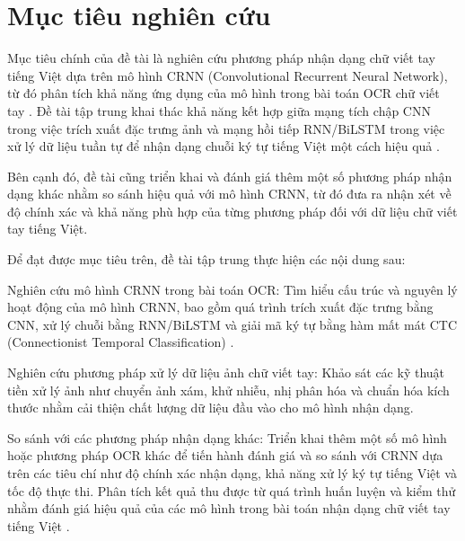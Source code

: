 
\section{Mục tiêu nghiên cứu}

Mục tiêu chính của đề tài là nghiên cứu phương pháp nhận dạng chữ viết tay tiếng Việt dựa trên mô hình CRNN (Convolutional Recurrent Neural Network), từ đó phân tích khả năng ứng dụng của mô hình trong bài toán OCR chữ viết tay \cite{Reference5}. Đề tài tập trung khai thác khả năng kết hợp giữa mạng tích chập CNN trong việc trích xuất đặc trưng ảnh và mạng hồi tiếp RNN/BiLSTM trong việc xử lý dữ liệu tuần tự để nhận dạng chuỗi ký tự tiếng Việt một cách hiệu quả \cite{Reference6}.

Bên cạnh đó, đề tài cũng triển khai và đánh giá thêm một số phương pháp nhận dạng khác nhằm so sánh hiệu quả với mô hình CRNN, từ đó đưa ra nhận xét về độ chính xác và khả năng phù hợp của từng phương pháp đối với dữ liệu chữ viết tay tiếng Việt.

Để đạt được mục tiêu trên, đề tài tập trung thực hiện các nội dung sau:

Nghiên cứu mô hình CRNN trong bài toán OCR:
Tìm hiểu cấu trúc và nguyên lý hoạt động của mô hình CRNN, bao gồm quá trình trích xuất đặc trưng bằng CNN, xử lý chuỗi bằng RNN/BiLSTM và giải mã ký tự bằng hàm mất mát CTC (Connectionist Temporal Classification) \cite{Reference7}.

Nghiên cứu phương pháp xử lý dữ liệu ảnh chữ viết tay:
Khảo sát các kỹ thuật tiền xử lý ảnh như chuyển ảnh xám, khử nhiễu, nhị phân hóa và chuẩn hóa kích thước nhằm cải thiện chất lượng dữ liệu đầu vào cho mô hình nhận dạng.

So sánh với các phương pháp nhận dạng khác:
Triển khai thêm một số mô hình hoặc phương pháp OCR khác để tiến hành đánh giá và so sánh với CRNN dựa trên các tiêu chí như độ chính xác nhận dạng, khả năng xử lý ký tự tiếng Việt và tốc độ thực thi. Phân tích kết quả thu được từ quá trình huấn luyện và kiểm thử nhằm đánh giá hiệu quả của các mô hình trong bài toán nhận dạng chữ viết tay tiếng Việt \cite{Reference5,Reference7}.
